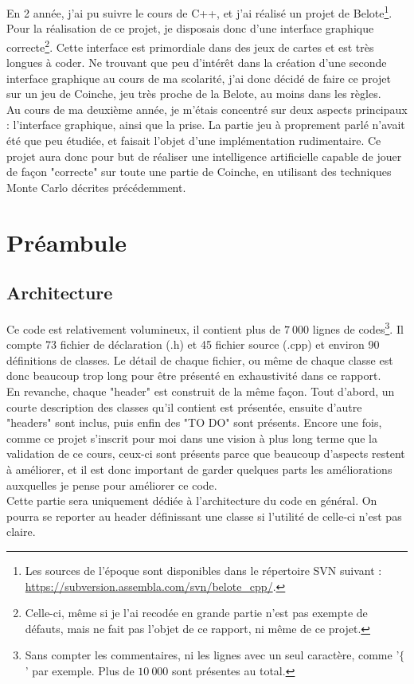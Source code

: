 \documentclass[a4paper,11pt]{article}
\begin{document}
En 2\ieme{} année, j'ai pu suivre le cours de C++, et j'ai réalisé un projet de Belote\footnote{Les sources de l'époque sont disponibles dans le répertoire SVN suivant : \url{https://subversion.assembla.com/svn/belote_cpp/}.}. Pour la réalisation de ce projet, je disposais donc d'une interface graphique correcte\footnote{Celle-ci, même si je l'ai recodée en grande partie n'est pas exempte de défauts, mais ne fait pas l'objet de ce rapport, ni même de ce projet.}. Cette interface est primordiale dans des jeux de cartes et est très longues à coder. Ne trouvant que peu d'intérêt dans la création d'une seconde interface graphique au cours de ma scolarité, j'ai donc décidé de faire ce projet sur un jeu de Coinche, jeu très proche de la Belote, au moins dans les règles. \\
Au cours de ma deuxième année, je m'étais concentré sur deux aspects principaux : l'interface graphique, ainsi que la prise. La partie jeu à proprement parlé n'avait été que peu étudiée, et faisait l'objet d'une implémentation rudimentaire. Ce projet aura donc pour but de réaliser une intelligence artificielle capable de jouer de façon "correcte" sur toute une partie de Coinche, en utilisant des techniques Monte Carlo décrites précédemment. \\

\clearpage
\section{Préambule}
\subsection{Architecture}
Ce code est relativement volumineux, il contient plus de $7~000$ lignes de codes\footnote{Sans compter les commentaires, ni les lignes avec un seul caractère, comme '$\{$' par exemple. Plus de $10~000$ sont présentes au total.}. Il compte 73 fichier de déclaration (.h) et 45 fichier source (.cpp) et environ 90 définitions de classes. Le détail de chaque fichier, ou même de chaque classe est donc beaucoup trop long pour être présenté en exhaustivité dans ce rapport. \\
En revanche, chaque "header" est construit de la même façon. Tout d'abord, un courte description des classes qu'il contient est présentée, ensuite d'autre "headers" sont inclus, puis enfin des "TO DO" sont présents. Encore une fois, comme ce projet s'inscrit pour moi dans une vision à plus long terme que la validation de ce cours, ceux-ci sont présents parce que beaucoup d'aspects restent à améliorer, et il est donc important de garder quelques parts les améliorations auxquelles je pense pour améliorer ce code.\\
Cette partie sera uniquement dédiée à l'architecture du code en général. On pourra se reporter au header définissant une classe si l'utilité de celle-ci n'est pas claire. \\
\end{document}
